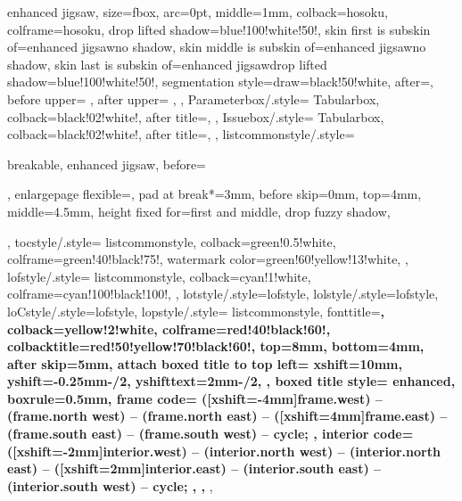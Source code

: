 {{    enhanced jigsaw,%
    size=fbox,%
    arc=0pt,%
    middle=1mm,%
    colback=hosoku,%
    colframe=hosoku,%
    drop lifted shadow={blue!100!white!50!},%
    skin first is subskin of={enhanced jigsaw}{no shadow},%
    skin middle is subskin of={enhanced jigsaw}{no shadow},%
    skin last is subskin of={enhanced jigsaw}{drop lifted shadow={blue!100!white!50!}},%
    segmentation style={draw=black!50!white},%
    after=\smallskip\noindent{\color{white}},%
    before upper={%
      \tcbtitle%
      \setcounter{GlobalFootnote}{\value{footnote}}%
      \let\oldfootnote=\footnote%
      \def\footnote{\stepcounter{GlobalFootnote}\oldfootnote[\arabic{GlobalFootnote}]}%
      \renewcommand\thempfootnote{\arabic{mpfootnote}}%
    },
    after upper={%
      \setcounter{footnote}{\value{GlobalFootnote}}%
      \let\footnote=\oldfootnote%
    },
  },
  Parameterbox/.style={%
    Tabularbox,
    colback=black!02!white!,%
    after title=\hfill\termblue{\parametername},%
  },%
  Issuebox/.style={%
    Tabularbox,
    colback=black!02!white!,%
    after title=\hfill\termblue{\issuename},%
  },%
  listcommonstyle/.style={%
    breakable,%
    enhanced jigsaw,%
    before=\par\bigskip\noindent,%
    enlargepage flexible=\baselineskip,%
    pad at break*=3mm,%
    before skip=0mm,%
    top=4mm,%
    middle=4.5mm,
    height fixed for=first and middle,%
    drop fuzzy shadow,
  },
  tocstyle/.style={%
    listcommonstyle,
    colback=green!0.5!white,%
    colframe=green!40!black!75!,%
    watermark color=green!60!yellow!13!white,%
  },
  lofstyle/.style={%
    listcommonstyle,
    colback=cyan!1!white,%
    colframe=cyan!100!black!100!,%
  },
  lotstyle/.style={lofstyle},
  lolstyle/.style={lofstyle},
  loCstyle/.style={lofstyle},
  lopstyle/.style={%
    listcommonstyle,
    fonttitle=\sffamily\bfseries\large,%
    colback=yellow!2!white,%
    colframe=red!40!black!60!,%
    colbacktitle=red!50!yellow!70!black!60!,%
    top=8mm,
    bottom=4mm,
    after skip=5mm,
    attach boxed title to top left={%
      xshift=10mm,%
      yshift=-0.25mm-\tcboxedtitleheight/2,%
      yshifttext=2mm-\tcboxedtitleheight/2,%
    },
    boxed title style={%
      enhanced,%
      boxrule=0.5mm,%
      frame code={%
         ([xshift=-4mm]frame.west) -- (frame.north west)
        -- (frame.north east) -- ([xshift=4mm]frame.east)
        -- (frame.south east) -- (frame.south west) -- cycle;
      },
      interior code={
         ([xshift=-2mm]interior.west)
        -- (interior.north west) -- (interior.north east)
        -- ([xshift=2mm]interior.east) -- (interior.south east) -- (interior.south west)
        -- cycle;
      },
    },
  },
}

